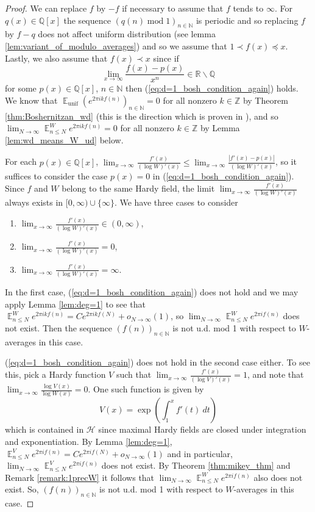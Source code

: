 \documentclass[12pt]{article}
\theoremstyle{plain} %
\theoremstyle{definition} %
\theoremstyle{plain}
\theoremstyle{plain}
\numberwithin{equation}{section}
\newcommand{\N}{\mathbb{N}}
\newcommand{\Z}{\mathbb{Z}}
\newcommand{\R}{\mathbb{R}}
\newcommand{\Q}{\mathbb{Q}}
\renewcommand{\leq}{\leqslant}
\renewcommand{\setminus}{\backslash}
\newcommand{\1}{\mathbbm{1}}
\newcommand{\E}{\operatorname{\mathbb{E}}}
\newcommand{\oo}{\infty}
\newcommand{\unif}{\operatorname{unif}}
\renewcommand{\mod}{\operatorname{mod}}
\begin{document}
\begin{proof}

We can replace $f$ by $-f$ if necessary to assume that $f$ tends to $\oo$. For $q(x)\in \Q[x]$ the sequence $(q(n)\mod 1)_{n\in \N}$ is periodic and so replacing $f$ by $f-q$ does not affect uniform distribution (see lemma \ref{lem:variant_of_modulo_averages}) and so we assume that $1\prec f(x)\preceq x$. Lastly, we also assume that $f(x)\prec x$ since if 
\[
\lim_{x\to\oo}\frac{f(x)-p(x)}{x^n}\in \R\setminus \Q
\]
for some $p(x)\in \Q[x]$, $n\in \N$ then (\ref{eq:d=1_bosh_condition_again}) holds. We know that $\E_{\unif}(e^{2\pi i kf(n)})_{n\in \N}=0$ for all nonzero $k\in \Z$ by Theorem \ref{thm:Boshernitzan_wd} (this is the direction which is proven in \cite[Theorem 1.10]{Boshernitzan}), and so $\lim_{N\to\oo}\E^W_{n\leq N}e^{2\pi i kf(n)}=0$ for all nonzero $k\in \Z$ by Lemma \ref{lem:wd_means_W_ud} below.

For each $p(x)\in \Q[x]$, $\lim_{x\to\oo}\frac{f'(x)}{(\log W)'(x)}\leq \lim_{x\to\oo}\frac{|f'(x)-p(x)|}{(\log W)'(x)}$, so it suffices to consider the case $p(x)=0$ in (\ref{eq:d=1_bosh_condition_again}). Since $f$ and $W$ belong to the same Hardy field, the limit $\lim_{x\to\oo}\frac{f'(x)}{(\log W)'(x)}$ always exists in $[0,\oo)\cup\{\oo\}$. We have three cases to consider
    \begin{enumerate}[label = (\arabic*)]
        \item $\lim_{x\to\oo}\frac{f'(x)}{(\log W)'(x)}\in(0,\oo)$,
        \item $\lim_{x\to\oo}\frac{f'(x)}{(\log W)'(x)}=0$,
        \item $\lim_{x\to\oo}\frac{f'(x)}{(\log W)'(x)}=\oo$.
    \end{enumerate}

    In the first case, (\ref{eq:d=1_bosh_condition_again}) does not hold and we may apply Lemma \ref{lem:deg=1} to see that $\E_{n\leq N}^We^{2\pi i kf(n)} = Ce^{2\pi i kf(N)}+o_{N\to\oo}(1)$, so $\lim_{N\to\oo}\E^W_{n\leq N}e^{2\pi i f(n)}$ does not exist. Then the sequence $(f(n))_{n\in \N}$ is not u.d. mod 1 with respect to $W$-averages in this case.


    (\ref{eq:d=1_bosh_condition_again}) does not hold in the second case either. To see this, pick a Hardy function $V$ such that $\lim_{x\to\oo}\frac{f'(x)}{(\log V)'(x)}=1$, and note that $\lim_{x\to\oo}\frac{\log V(x)}{\log {W}(x)}=0$. One such function is given by 
    \begin{equation}\label{eq:maximal_hardy_field_function}
        V(x) = \exp\left(\int_{1}^xf'(t)~dt\right)
    \end{equation}
which is contained in $\mathcal{H}$ since maximal Hardy fields are closed under integration and exponentiation. By Lemma \ref{lem:deg=1}, $
    \E_{n\leq N}^{V}e^{2\pi i f(n)} = Ce^{2\pi i f(N)}+o_{N\to\oo}(1)$ and in particular, $\lim_{N\to\oo}\E^{V}_{n\leq N}e^{2\pi i f(n)}$ does not exist. By Theorem \ref{thm:mikey_thm} and Remark \ref{remark:1precW} it follows that $\lim_{N\to\oo}\E^{{W}}_{n\leq N}e^{2\pi i f(n)}$ also does not exist. So, $(f(n))_{n\in \N}$ is not u.d. mod 1 with respect to $W$-averages in this case.



\end{proof}
\end{document}
